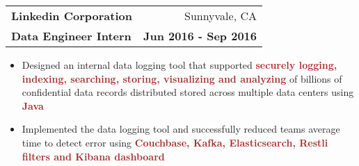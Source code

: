 \documentclass[letterpaper,11pt]{article}
\makeatletter
\newcommand{\resumeSubheading}[4]{
  \vspace{-1pt}\item
    \begin{tabular*}{0.97\textwidth}{l@{\extracolsep{\fill}}r}
      \textbf{#1} & #2 \\
      \textbf{\small#3} & \textbf{\small #4} \\
    \end{tabular*}\vspace{-5pt}
}
\makeatother
\begin{document}
      
    \resumeSubheading
      {Linkedin Corporation}{Sunnyvale, CA}
      {Data Engineer Intern}{Jun 2016 - Sep 2016}
        \begin{itemize}
        \item{Designed an internal data logging tool that supported \textcolor{Brown}{\textbf{securely logging, indexing, searching, storing, visualizing and analyzing}} of billions of confidential data records distributed stored across multiple data centers using \textcolor{Brown}{\textbf{Java}}}
        \item{Implemented the data logging tool and successfully reduced teams average time to detect error using \textcolor{Brown}{\textbf{Couchbase, Kafka, Elasticsearch, Restli filters and Kibana dashboard}}}
        \end{itemize}
        \vspace{-8pt}
    
\end{document}
